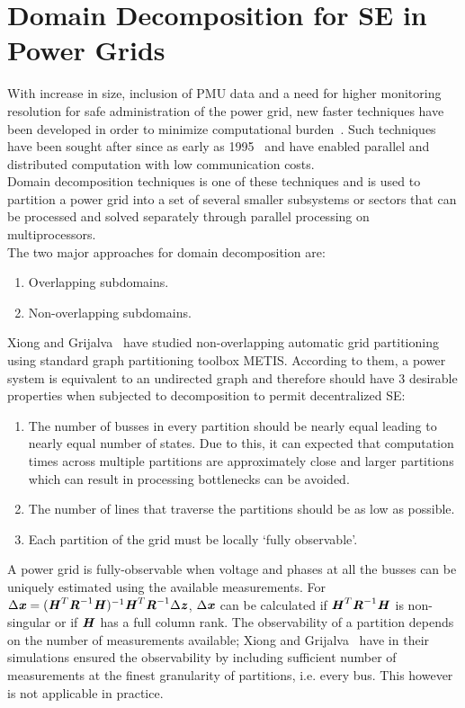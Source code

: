 \documentclass[thesis.tex]{subfiles}
\begin{document}
\section{Domain Decomposition for SE in Power Grids}\label{ddec}
With increase in size, inclusion of PMU data and a need for higher monitoring resolution for safe administration of the power grid, new faster techniques have been developed in order to minimize computational burden~\cite{Xiong}\cite{Muscas}\cite{KarimipourDec}. Such techniques have been sought after since as early as 1995~\cite{Falcao} and have enabled parallel and distributed computation with low communication costs. \\
Domain decomposition techniques is one of these techniques and is used to partition a power grid into a set of several smaller subsystems or sectors that can be processed and solved separately through parallel processing on multiprocessors. \\
The two major approaches for domain decomposition are:
\begin{enumerate}
	\item Overlapping subdomains.
	\item Non-overlapping subdomains.
\end{enumerate}
Xiong and Grijalva~\cite{Xiong} have studied non-overlapping automatic grid partitioning using standard graph partitioning toolbox METIS. According to them, a power system is equivalent to an undirected graph and therefore should have 3 desirable properties when subjected to decomposition to permit decentralized SE:
\begin{enumerate}
	\item The number of busses in every partition should be nearly equal leading to nearly equal number of states. Due to this, it can expected that computation times across multiple partitions are approximately close and larger partitions which can result in processing bottlenecks can be avoided.
	\item The number of lines that traverse the partitions should be as low as possible. 
	\item Each partition of the grid must be locally ‘fully observable’.
\end{enumerate}
A power grid is fully-observable when voltage and phases at all the busses can be uniquely estimated using the available measurements. For $\Delta \textbf{\textit{x}} = (\textbf{\textit{H}}^{T}\textbf{\textit{R}}^{-1}\textbf{\textit{H}})^{-1}\textbf{\textit{H}}^{T}\textbf{\textit{R}}^{-1}\Delta \textbf{\textit{z}}$, $\Delta \textbf{\textit{x}}$ can be calculated if $\textbf{\textit{H}}^{T}\textbf{\textit{R}}^{-1}\textbf{\textit{H}}$ is non-singular or if $\textbf{\textit{H}}$ has a full column rank. The observability of a partition depends on the number of measurements available; Xiong and Grijalva~\cite{Xiong} have in their simulations ensured the observability by including sufficient number of measurements at the finest granularity of partitions, i.e. every bus. This however is not applicable in practice.\\\\
\end{document}
